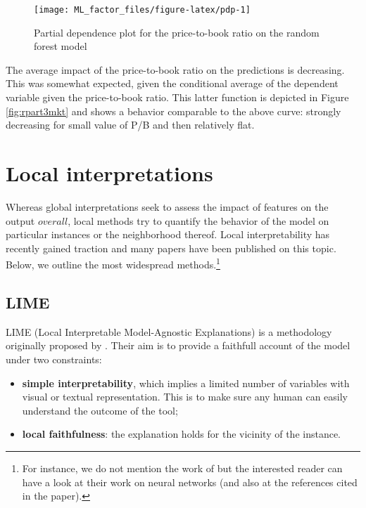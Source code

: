\documentclass[]{krantz}
\providecommand{\tightlist}{%
  \setlength{\itemsep}{0pt}\setlength{\parskip}{0pt}}
\let\rmarkdownfootnote\footnote%
\def\footnote{\protect\rmarkdownfootnote}
\theoremstyle{definition}
\theoremstyle{definition}
\theoremstyle{definition}
\theoremstyle{remark}
\begin{document}
\begin{figure}[H]

{\centering \texttt{[image: ML\_factor\_files/figure-latex/pdp-1]} 

}

\caption{Partial dependence plot for the price-to-book ratio on the random forest model}\label{fig:pdp}
\end{figure}

\normalsize

The average impact of the price-to-book ratio on the predictions is
decreasing. This was somewhat expected, given the conditional average of
the dependent variable given the price-to-book ratio. This latter
function is depicted in Figure \ref{fig:rpart3mkt} and shows a behavior
comparable to the above curve: strongly decreasing for small value of
P/B and then relatively flat.

\hypertarget{local-interpretations}{%
\section{Local interpretations}\label{local-interpretations}}

Whereas global interpretations seek to assess the impact of features on
the output \(overall\), local methods try to quantify the behavior of
the model on particular instances or the neighborhood thereof. Local
interpretability has recently gained traction and many papers have been
published on this topic. Below, we outline the most widespread
methods.\footnote{For instance, we do not mention the work of
  \citet{horel2019towards} but the interested reader can have a look at
  their work on neural networks (and also at the references cited in the
  paper).}

\hypertarget{lime}{%
\subsection{LIME}\label{lime}}

LIME (Local Interpretable Model-Agnostic Explanations) is a methodology
originally proposed by \citet{ribeiro2016should}. Their aim is to
provide a faithfull account of the model under two constraints:

\begin{itemize}
\tightlist
\item
  \textbf{simple interpretability}, which implies a limited number of
  variables with visual or textual representation. This is to make sure
  any human can easily understand the outcome of the tool;
\item
  \textbf{local faithfulness}: the explanation holds for the vicinity of
  the instance.
\end{itemize}
\end{document}
